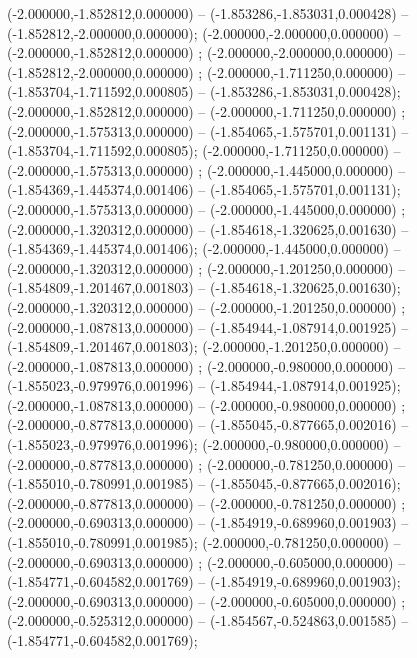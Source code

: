  (-2.000000,-1.852812,0.000000) -- (-1.853286,-1.853031,0.000428) -- (-1.852812,-2.000000,0.000000);
 (-2.000000,-2.000000,0.000000) -- (-2.000000,-1.852812,0.000000) ;
 (-2.000000,-2.000000,0.000000) -- (-1.852812,-2.000000,0.000000) ;
 (-2.000000,-1.711250,0.000000) -- (-1.853704,-1.711592,0.000805) -- (-1.853286,-1.853031,0.000428);
 (-2.000000,-1.852812,0.000000) -- (-2.000000,-1.711250,0.000000) ;
 (-2.000000,-1.575313,0.000000) -- (-1.854065,-1.575701,0.001131) -- (-1.853704,-1.711592,0.000805);
 (-2.000000,-1.711250,0.000000) -- (-2.000000,-1.575313,0.000000) ;
 (-2.000000,-1.445000,0.000000) -- (-1.854369,-1.445374,0.001406) -- (-1.854065,-1.575701,0.001131);
 (-2.000000,-1.575313,0.000000) -- (-2.000000,-1.445000,0.000000) ;
 (-2.000000,-1.320312,0.000000) -- (-1.854618,-1.320625,0.001630) -- (-1.854369,-1.445374,0.001406);
 (-2.000000,-1.445000,0.000000) -- (-2.000000,-1.320312,0.000000) ;
 (-2.000000,-1.201250,0.000000) -- (-1.854809,-1.201467,0.001803) -- (-1.854618,-1.320625,0.001630);
 (-2.000000,-1.320312,0.000000) -- (-2.000000,-1.201250,0.000000) ;
 (-2.000000,-1.087813,0.000000) -- (-1.854944,-1.087914,0.001925) -- (-1.854809,-1.201467,0.001803);
 (-2.000000,-1.201250,0.000000) -- (-2.000000,-1.087813,0.000000) ;
 (-2.000000,-0.980000,0.000000) -- (-1.855023,-0.979976,0.001996) -- (-1.854944,-1.087914,0.001925);
 (-2.000000,-1.087813,0.000000) -- (-2.000000,-0.980000,0.000000) ;
 (-2.000000,-0.877813,0.000000) -- (-1.855045,-0.877665,0.002016) -- (-1.855023,-0.979976,0.001996);
 (-2.000000,-0.980000,0.000000) -- (-2.000000,-0.877813,0.000000) ;
 (-2.000000,-0.781250,0.000000) -- (-1.855010,-0.780991,0.001985) -- (-1.855045,-0.877665,0.002016);
 (-2.000000,-0.877813,0.000000) -- (-2.000000,-0.781250,0.000000) ;
 (-2.000000,-0.690313,0.000000) -- (-1.854919,-0.689960,0.001903) -- (-1.855010,-0.780991,0.001985);
 (-2.000000,-0.781250,0.000000) -- (-2.000000,-0.690313,0.000000) ;
 (-2.000000,-0.605000,0.000000) -- (-1.854771,-0.604582,0.001769) -- (-1.854919,-0.689960,0.001903);
 (-2.000000,-0.690313,0.000000) -- (-2.000000,-0.605000,0.000000) ;
 (-2.000000,-0.525312,0.000000) -- (-1.854567,-0.524863,0.001585) -- (-1.854771,-0.604582,0.001769);
